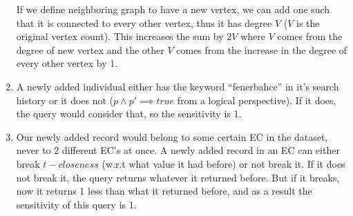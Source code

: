 \documentclass[12pt,reqno]{amsart}
\begin{document}
\begin{enumerate}[label=(\alph*)]
If we define neighboring graph to have a new vertex, we can add one such that it is connected to every other vertex, thus it has degree $V$ ($V$ is the original vertex count). This increases the sum by $2V$ where $V$ comes from the degree of new vertex and the other $V$ comes from the increase in the degree of every other vertex by 1.
\item A newly added individual either has the keyword ``fenerbahce'' in it's search history or it does not ($p \land p' \implies true$ from a logical perspective). If it does, the query would consider that, so the sensitivity is 1.
\item Our newly added record would belong to some certain EC in the dataset, never to 2 different EC's at once. A newly added record in an EC can either break $t-closeness$ (w.r.t what value it had before) or not break it. If it does not break it, the query returns whatever it returned before. But if it breaks, now it returns 1 less than what it returned before, and as a result the sensitivity of this query is 1.
\end{enumerate}
\end{document}
